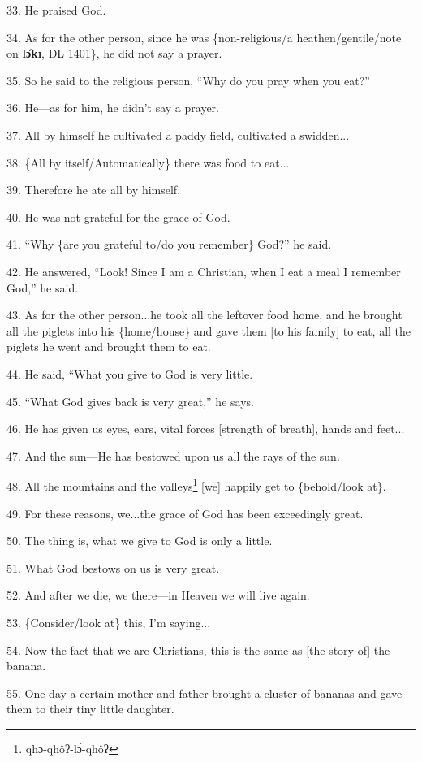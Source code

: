 33. He praised God.

34. As for the other person, since he was \{non-religious/a heathen/gentile/note
on \textbf{lɔ̂kī}, DL 1401\}, he did not say a prayer.

35. So he said to the religious person, ``Why do you pray when you eat?''

36. He---as for him, he didn't say a prayer.

37. All by himself he cultivated a paddy field, cultivated a swidden...

38. \{All by itself/Automatically\} there was food to eat...

39. Therefore he ate all by himself.

40. He was not grateful for the grace of God.

41. ``Why \{are you grateful to/do you remember\} God?'' he said.

42. He answered, ``Look! Since I am a Christian, when I eat a meal I remember God,''
he said.

43. As for the other person...he took all the leftover food home, and he brought
all the piglets into his \{home/house\} and gave them [to his family] to eat, all
the piglets he went and brought them to eat.

44. He said, ``What you give to God is very little.

45. ``What God gives back is very great,'' he says.

46. He has given us eyes, ears, vital forces [strength of breath], hands and feet...

47. And the sun---He has bestowed upon us all the rays of the sun.

48. All the mountains and the valleys\footnote{qhɔ-qhôʔ-lɔ̀-qhôʔ} [we] happily get to \{behold/look at\}.

49. For these reasons, we...the grace of God has been exceedingly great.

50. The thing is, what we give to God is only a little.

51. What God bestows on us is very great.

52. And after we die, we there---in Heaven we will live again.

53. \{Consider/look at\} this, I'm saying...

54. Now the fact that we are Christians, this is the same as [the story of] the
banana.

55. One day a certain mother and father brought a cluster of bananas and gave them
to their tiny little daughter.

